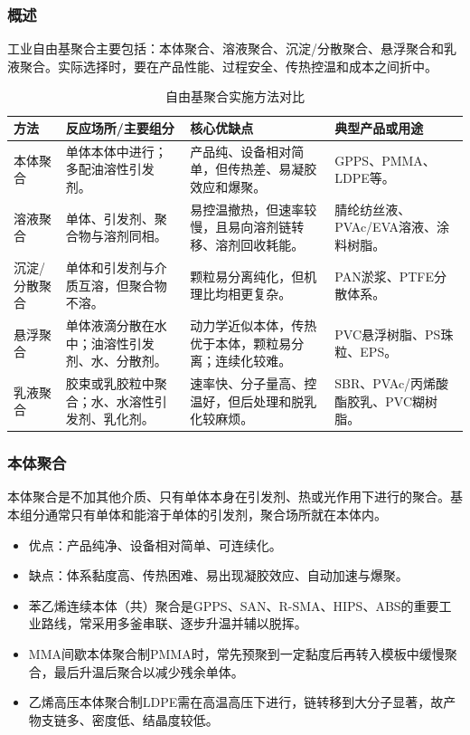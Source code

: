 ﻿\documentclass[12pt,a4paper]{article}
\renewcommand{\arraystretch}{1.18}
\begin{document}
\subsubsection{概述}
工业自由基聚合主要包括：本体聚合、溶液聚合、沉淀/分散聚合、悬浮聚合和乳液聚合。实际选择时，要在产品性能、过程安全、传热控温和成本之间折中。
\begin{table}[!t]
  \centering
  \caption{自由基聚合实施方法对比}
  {\small
  \setlength{\tabcolsep}{5pt}
  \renewcommand{\arraystretch}{1.22}
  \begin{tabularx}{\textwidth}{C{1.8cm}Y Y Y}
    \toprule
    \textbf{方法} & \textbf{反应场所/主要组分} & \textbf{核心优缺点} & \textbf{典型产品或用途} \\
    \midrule
    本体聚合 & 单体本体中进行；多配油溶性引发剂。 & 产品纯、设备相对简单，但传热差、易凝胶效应和爆聚。 & GPPS、PMMA、LDPE等。 \\
    溶液聚合 & 单体、引发剂、聚合物与溶剂同相。 & 易控温撤热，但速率较慢，且易向溶剂链转移、溶剂回收耗能。 & 腈纶纺丝液、PVAc/EVA溶液、涂料树脂。 \\
    沉淀/分散聚合 & 单体和引发剂与介质互溶，但聚合物不溶。 & 颗粒易分离纯化，但机理比均相更复杂。 & PAN淤浆、PTFE分散体系。 \\
    悬浮聚合 & 单体液滴分散在水中；油溶性引发剂、水、分散剂。 & 动力学近似本体，传热优于本体，颗粒易分离；连续化较难。 & PVC悬浮树脂、PS珠粒、EPS。 \\
    乳液聚合 & 胶束或乳胶粒中聚合；水、水溶性引发剂、乳化剂。 & 速率快、分子量高、控温好，但后处理和脱乳化较麻烦。 & SBR、PVAc/丙烯酸酯胶乳、PVC糊树脂。 \\
    \bottomrule
  \end{tabularx}
  }
\end{table}

\subsubsection{本体聚合}
本体聚合是不加其他介质、只有单体本身在引发剂、热或光作用下进行的聚合。基本组分通常只有单体和能溶于单体的引发剂，聚合场所就在本体内。
\begin{itemize}
  \item 优点：产品纯净、设备相对简单、可连续化。
  \item 缺点：体系黏度高、传热困难、易出现凝胶效应、自动加速与爆聚。
  \item 苯乙烯连续本体（共）聚合是GPPS、SAN、R-SMA、HIPS、ABS的重要工业路线，常采用多釜串联、逐步升温并辅以脱挥。
  \item MMA间歇本体聚合制PMMA时，常先预聚到一定黏度后再转入模板中缓慢聚合，最后升温后聚合以减少残余单体。
  \item 乙烯高压本体聚合制LDPE需在高温高压下进行，链转移到大分子显著，故产物支链多、密度低、结晶度较低。
\end{itemize}
\end{document}
